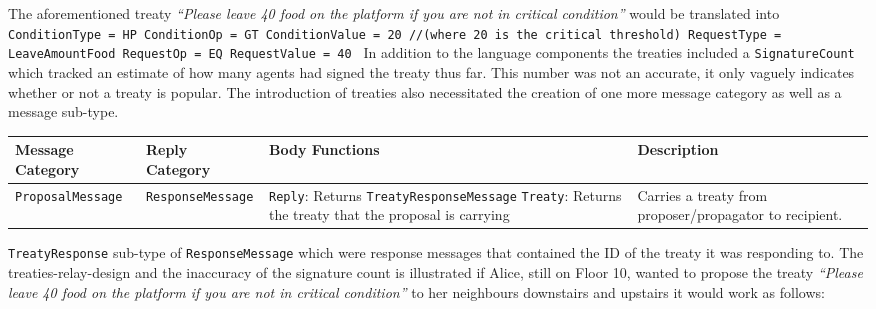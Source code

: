 \vspace{\baselineskip}
The aforementioned treaty \textit{“Please leave 40 food on the platform if you are not in critical condition”} would be translated into \newline
\texttt{ConditionType = HP \newline
        ConditionOp = GT \newline
        ConditionValue = 20 //(where 20 is the critical threshold) \newline
        RequestType = LeaveAmountFood \newline
        RequestOp = EQ \newline
        RequestValue = 40 \newline}
In addition to the language components the treaties included a \texttt{SignatureCount} which tracked an estimate of how many agents had signed the treaty thus far. This number was not an accurate, it only vaguely indicates whether or not a treaty is popular. 
The introduction of treaties also necessitated the creation of one more message category as well as a message sub-type. 
\begin{center}
\begin{tabular}{p{3cm}p{3cm}p{5cm}p{3.5cm}}
 \hline
 \textbf{Message \newline Category} & \textbf{Reply \newline Category} & \textbf{Body Functions} & \textbf{Description} \\ [0.5ex] 
 \hline\hline
 \texttt{ProposalMessage} & \texttt{ResponseMessage} &  
 \texttt{Reply}: Returns \texttt{TreatyResponseMessage} \newline 
 \texttt{Treaty}: Returns the treaty that the proposal is carrying &
 Carries a treaty from proposer/propagator to recipient.\\
 \hline
\end{tabular}
\end{center}
\texttt{TreatyResponse} sub-type of \texttt{ResponseMessage} which were response messages that contained the ID of the treaty it was responding to. \newline
The treaties-relay-design and the inaccuracy of the signature count is illustrated if Alice, still on Floor 10, wanted to propose the treaty \textit{“Please leave 40 food on the platform if you are not in critical condition”} to her neighbours downstairs and upstairs it would work as follows:
